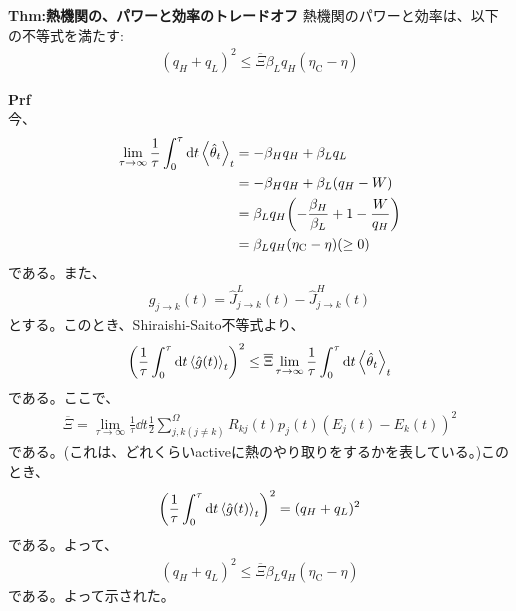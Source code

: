 \documentclass[a4paper,11pt]{jsarticle}
\numberwithin{equation}{section}
\begin{document}
\begin{itembox}[l]{\textbf{Thm:熱機関の、パワーと効率のトレードオフ}}
    熱機関のパワーと効率は、以下の不等式を満たす:
    \begin{align}
      (q_H + q_L)^2 \leq \overline{\Xi} \beta_L q_H (\eta_{\text{C}} - \eta) 
    \end{align}

\end{itembox}
\textbf{Prf}\\
今、
\begin{align}
    \lim_{\tau \to \infty}\frac{1}{\tau}\int_0^{\tau} \dd{t}\ev{\hat{\theta}_t}_t &= -\beta_H q_H + \beta_L q_L\\
    &= -\beta_H q_H + \beta_L (q_H - W)\\
    &= \beta_L q_H \qty(-\frac{\beta_H}{\beta_L} + 1 - \frac{W}{q_H})\\
      &= \beta_L q_H (\eta_{\text{C}} - \eta) (\geq 0)
  \end{align}
  である。また、
\begin{align}
  g_{j \to k}(t) = \hat{J}_{j \to k}^L(t) - \hat{J}_{j \to k}^H(t)
\end{align}
とする。このとき、Shiraishi-Saito不等式より、
\begin{align}
  \left(\frac{1}{\tau}\int_0^{\tau} \dd{t}\ev{\hat{g}(t)}_t\right)^2 \leq \overline{\Xi} \lim_{\tau \to \infty}\frac{1}{\tau}\int_0^{\tau} \dd{t}\ev{\hat{\theta}_t}_t
\end{align}
である。ここで、
\begin{align}
  \overline{\Xi} = \lim_{\tau \to \infty}\frac{1}{\tau} \dd{t} \frac{1}{2}\sum_{j,k(j \neq k)}^{\Omega} R_{kj}(t)p_j(t) (E_j(t) - E_k(t))^2
\end{align}
である。(これは、どれくらいactiveに熱のやり取りをするかを表している。)このとき、
\begin{align}
  \qty(\frac{1}{\tau}\int_0^{\tau} \dd{t}\ev{\hat{g}(t)}_t)^2 = (q_H + q_L)^2
\end{align}
である。よって、
\begin{align}
  (q_H + q_L)^2 \leq \overline{\Xi} \beta_L q_H (\eta_{\text{C}} - \eta)
\end{align}
である。よって示された。\qedsymbol\\
\end{document}
